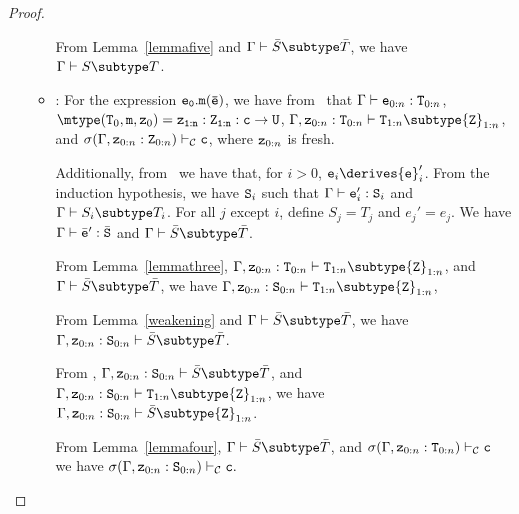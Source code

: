 \begin{proof}
\begin{itemize}
\begin{itemize}
            From Lemma~\ref{lemmafive} and
            $\Gamma \vdash \bar{S} \subtype \bar{T}$, we have
            $\Gamma \vdash S \subtype T$.
   \item
   \RCInvkArg: For the expression ${\tt e_0.m(\bar{e})}$,
            we have from \TInvk\ that
            $\Gamma \vdash {\tt e}_{0:n} : {\tt T}_{0:n}$,
            $\mtype({\tt T}_0,{\tt m},{\tt z}_0) = 
               \tt {\tt z}_{1:n}: {\tt Z}_{1:n}:c \rightarrow {\tt U}$,
            $\Gamma, {\tt z}_{0:n}: {\tt T}_{0:n} \vdash 
                  {\tt T}_{1:n} \subtype {\tt Z}_{1:n}$, and
            $\sigma(\Gamma, {\tt z}_{0:n}: {\tt Z}_{0:n}) \vdash_{\cal C}                          {\tt c}$, 
            where ${\tt z}_{0:n}$ is fresh.

            Additionally, from \RCInvkArg\ we have that, for $i>0$,
            ${\tt e}_i \derives {{\tt e}}_i'$.
            From the induction hypothesis, we have ${\tt S}_i$ such that
            $\Gamma \vdash {\tt e}_i': {{\tt S}}_i$ and 
            $\Gamma \vdash S_i \subtype T_i$.
            For all $j$ except $i$, define $S_j = T_j$ and $e_j' = e_j$.
            We have 
            $\Gamma \vdash \bar{\tt e}': \bar{\tt S}$ and
            $\Gamma \vdash \bar{S} \subtype \bar{T}$.

            From Lemma~\ref{lemmathree},
            $\Gamma, {\tt z}_{0:n}: {\tt T}_{0:n} \vdash
                  {\tt T}_{1:n} \subtype {\tt Z}_{1:n}$,
            and $\Gamma \vdash \bar{S} \subtype \bar{T}$, we have
            $\Gamma, {\tt z}_{0:n}: {\tt S}_{0:n} \vdash
                  {\tt T}_{1:n} \subtype {\tt Z}_{1:n}$,

            From Lemma~\ref{weakening} and 
            $\Gamma \vdash \bar{S} \subtype \bar{T}$, 
            we have 
            $\Gamma, {\tt z}_{0:n}: {\tt S}_{0:n} \vdash 
                  \bar{S} \subtype \bar{T}$.

            From ,
            $\Gamma, {\tt z}_{0:n}: {\tt S}_{0:n} \vdash 
                  \bar{S} \subtype \bar{T}$,
            and
            $\Gamma, {\tt z}_{0:n}: {\tt S}_{0:n} \vdash 
                    {\tt T}_{1:n} \subtype {\tt Z}_{1:n}$, 
            we have
            $\Gamma, {\tt z}_{0:n}: {\tt S}_{0:n} \vdash 
                  \bar{S} \subtype {\tt Z}_{1:n}$.

            From Lemma~\ref{lemmafour}, 
            $\Gamma \vdash \bar{S} \subtype \bar{T}$, and
            $\sigma(\Gamma, {\tt z}_{0:n}: {\tt T}_{0:n}) \vdash_{\cal C}
                              {\tt c}$
            we have
            $\sigma(\Gamma, {\tt z}_{0:n}: {\tt S}_{0:n}) \vdash_{\cal C}
                              {\tt c}.$


\end{itemize}
\end{itemize}
\end{proof}
